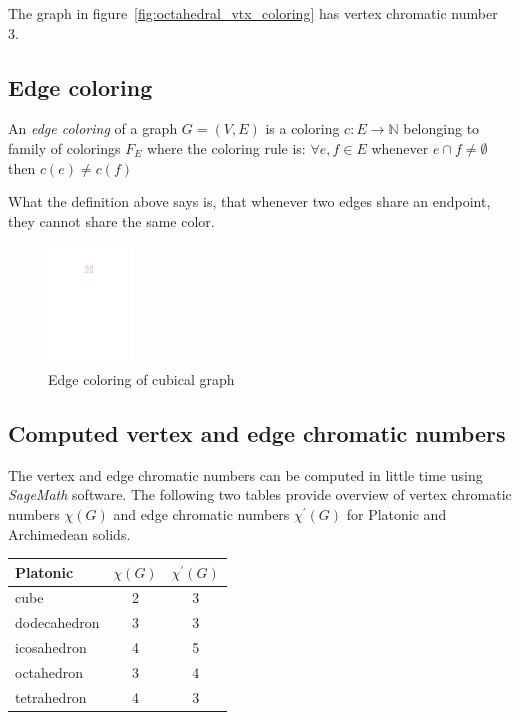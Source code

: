 The graph in figure~\ref{fig:octahedral_vtx_coloring} has vertex chromatic number 3.

\subsection{Edge coloring}

\begin{definition}
    An \textit{edge coloring} of a graph $G=(V,E)$ is a coloring $c: E \rightarrow \mathbb{N}$ belonging to family of colorings $F_E$ where the coloring rule is: $\forall e,f \in E$ whenever $e \cap f \neq \emptyset$ then $c(e) \neq c(f)$
\end{definition}

What the definition above says is, that whenever two edges share an endpoint, they cannot share the same color. 

\begin{figure}[H]
    \centering
    \includegraphics[width=0.2\textwidth]{../Resources/Figs/cubical_edg_colr.pdf}
    \caption{Edge coloring of cubical graph}
    \label{fig:cubical_edge_coloring}
\end{figure}

\subsection{Computed vertex and edge chromatic numbers}

The vertex and edge chromatic numbers can be computed in little time using \textit{SageMath} software. The following two tables provide overview of vertex chromatic numbers $\chi(G)$ and edge chromatic numbers $\chi^{'}(G)$ for Platonic and Archimedean solids.

\begin{center}
\begin{tabular}{|l|c|c|}
\hline
Platonic & $\chi(G)$ & $\chi^{'}(G)$ \\
\hline\hline
cube & 2 & 3 \\
\hline
dodecahedron & 3 & 3 \\
\hline
icosahedron & 4 & 5 \\
\hline
octahedron & 3 & 4 \\
\hline
tetrahedron & 4 & 3 \\
\hline
\end{tabular}
\end{center}

